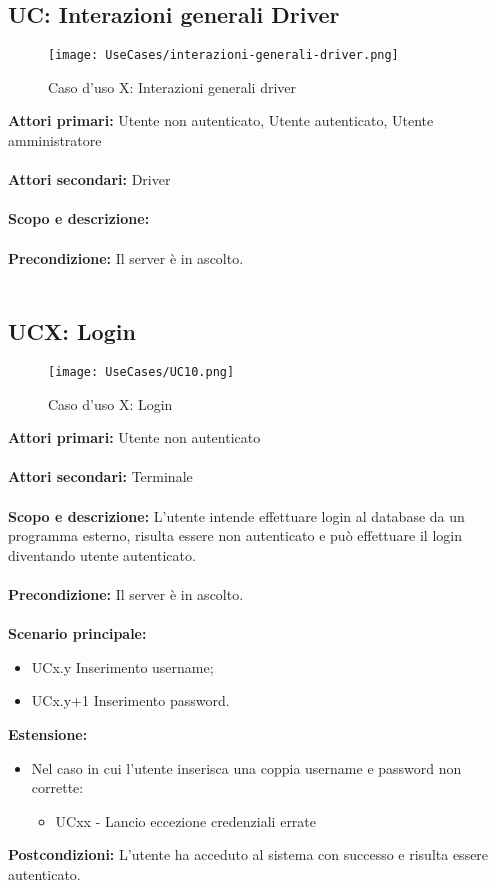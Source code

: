 \documentclass{scalatekids-article}
\begin{document}
\subsection{UC: Interazioni generali Driver}
\begin{figure}[H]
  \begin{center}
    \texttt{[image: UseCases/interazioni-generali-driver.png]}
    \caption*{Caso d'uso X: Interazioni generali driver}
  \end{center}
\end{figure}
\textbf{Attori primari:} Utente non autenticato, Utente autenticato, Utente amministratore\\ \\
\textbf{Attori secondari:} Driver\\ \\
\textbf{Scopo e descrizione:} \\ \\%
\textbf{Precondizione:} Il server è in ascolto.\\ \\

\subsection{UCX: Login}

\begin{figure}[H]
  \begin{center}
    \texttt{[image: UseCases/UC10.png]}
    \caption*{Caso d'uso X: Login}
  \end{center}
\end{figure}
\textbf{Attori primari:} Utente non autenticato\\ \\
\textbf{Attori secondari:} Terminale\\ \\
\textbf{Scopo e descrizione:}
L'utente intende effettuare login al database da un programma  esterno, risulta essere non autenticato e può effettuare il login diventando utente autenticato.\\ \\
\textbf{Precondizione:} Il server è in ascolto.\\ \\
\textbf{Scenario principale:}
\begin{itemize}
\item UCx.y Inserimento username;
\item UCx.y+1 Inserimento password.
\end{itemize}
\textbf{Estensione:}
\begin{itemize}
  \item Nel caso in cui l'utente inserisca una coppia username e password non corrette:
  \begin{itemize}
    \item UCxx - Lancio eccezione credenziali errate
  \end{itemize}
\end{itemize}
\textbf{Postcondizioni:} L'utente ha acceduto al sistema con successo e risulta essere autenticato.
\end{document}

